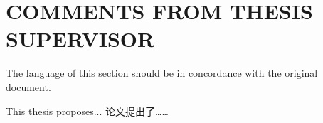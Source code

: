 
\chapter{COMMENTS FROM THESIS SUPERVISOR}

The language of this section should be in concordance with the original document.

This thesis proposes...
论文提出了……
